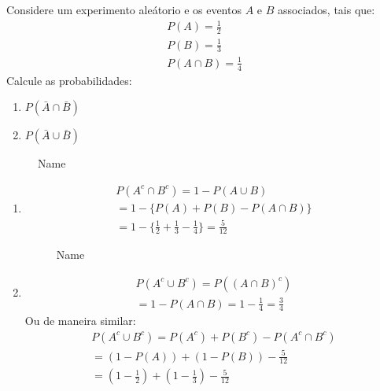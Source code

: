 \documentclass[11pt,a4paper]{book}
\begin{document}
\begin{description}
    Considere um experimento aleátorio e os eventos $A$ e $B$ associados, tais que:
    \begin{align*}
      P(A)= \frac{1}{2}\\
      P(B)= \frac{1}{3}\\
      P(A \cap B)= \frac{1}{4}
    \end{align*}
    Calcule as probabilidades:
    \begin{enumerate}[label=(\alph*)]
      \item $ P(\bar{A} \cap \bar{B})$
      \item $P(\bar{A} \cup \bar{B})$
    \end{enumerate}
    \begin{figure}[htpb]
      \centering
      \caption{Name}
      \label{fig:14}
    \end{figure}
    \begin{enumerate}[label=(\alph*)]
      \item \begin{align*}
          P(A^c \cap B^c) = 1- P(A \cup B) \\
          = 1- \{ P(A) + P(B) - P(A \cap B) \} \\
          =1 - \{ \frac{1}{2} + \frac{1}{3} -\frac{1}{4}\}= \frac{5}{12}
        \end{align*}
        \begin{figure}[htpb]
          \centering
          \caption{Name}
          \label{fig:15}
        \end{figure}
      \item \begin{align*}
          P(A^c \cup B^c) = P\left( \left( A \cap B\right)^c \right)\\
          = 1- P(A \cap B) = 1 - \frac{1}{4}= \frac{3}{4}
        \end{align*}  
        Ou de maneira similar:
        \begin{align*}
          P(A^c \cup B^c) = P(A^c) + P(B^c ) - P(A^c \cap B^c) \\
          = (1- P(A)) + (1- P(B)) - \frac{5}{12} \\
          = (1 - \frac{1}{2})+ (1 - \frac{1}{3})- \frac{5}{12}
        \end{align*}

    \end{enumerate}

\end{description}
\end{document}
